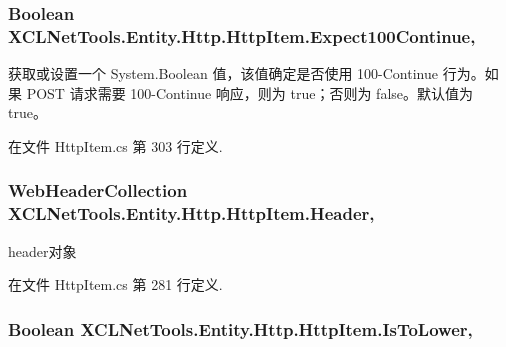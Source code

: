 \hypertarget{class_x_c_l_net_tools_1_1_entity_1_1_http_1_1_http_item_a378c7e8a43937807df263b1985c3b945}{
\subsubsection[{Expect100\-Continue}]{\setlength{\rightskip}{0pt plus 5cm}Boolean X\-C\-L\-Net\-Tools.\-Entity.\-Http.\-Http\-Item.\-Expect100\-Continue\hspace{0.3cm}{\ttfamily [get]}, {\ttfamily [set]}}}\label{class_x_c_l_net_tools_1_1_entity_1_1_http_1_1_http_item_a378c7e8a43937807df263b1985c3b945}


获取或设置一个 System.\-Boolean 值，该值确定是否使用 100-\/\-Continue 行为。如果 P\-O\-S\-T 请求需要 100-\/\-Continue 响应，则为 true；否则为 false。默认值为 true。 



在文件 Http\-Item.\-cs 第 303 行定义.

\hypertarget{class_x_c_l_net_tools_1_1_entity_1_1_http_1_1_http_item_a803ddfa9179e1ad325783327db8273ac}{
\subsubsection[{Header}]{\setlength{\rightskip}{0pt plus 5cm}Web\-Header\-Collection X\-C\-L\-Net\-Tools.\-Entity.\-Http.\-Http\-Item.\-Header\hspace{0.3cm}{\ttfamily [get]}, {\ttfamily [set]}}}\label{class_x_c_l_net_tools_1_1_entity_1_1_http_1_1_http_item_a803ddfa9179e1ad325783327db8273ac}


header对象 



在文件 Http\-Item.\-cs 第 281 行定义.

\hypertarget{class_x_c_l_net_tools_1_1_entity_1_1_http_1_1_http_item_a8b9e3149b03e7ca279e247817a2ef205}{
\subsubsection[{Is\-To\-Lower}]{\setlength{\rightskip}{0pt plus 5cm}Boolean X\-C\-L\-Net\-Tools.\-Entity.\-Http.\-Http\-Item.\-Is\-To\-Lower\hspace{0.3cm}{\ttfamily [get]}, {\ttfamily [set]}}}\label{class_x_c_l_net_tools_1_1_entity_1_1_http_1_1_http_item_a8b9e3149b03e7ca279e247817a2ef205}


